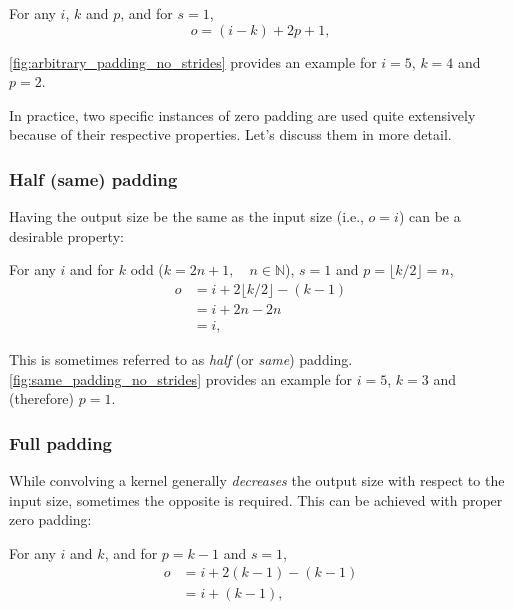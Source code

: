 \begin{relationship}\label{rel:arbitrary_padding_no_strides}
For any $i$, $k$ and $p$, and for $s = 1$,
\begin{equation*}
    o = (i - k) + 2p + 1,
\end{equation*}
\end{relationship}

\noindent \autoref{fig:arbitrary_padding_no_strides} provides an example for $i
= 5$, $k = 4$ and $p = 2$.

In practice, two specific instances of zero padding are used quite extensively
because of their respective properties. Let's discuss them in more detail.

\subsubsection{Half (same) padding}

Having the output size be the same as the input size (i.e., $o = i$) can be a
desirable property:

\begin{relationship}\label{rel:same_padding_no_strides}
For any $i$ and for $k$ odd ($k = 2n + 1, \quad n \in \mathbb{N}$), $s = 1$ and
$p = \lfloor k / 2 \rfloor = n$,
\begin{equation*}
\begin{split}
    o &= i + 2 \lfloor k / 2 \rfloor - (k - 1) \\
      &= i + 2n - 2n \\
      &= i,
\end{split}
\end{equation*}
\end{relationship}

\noindent This is sometimes referred to as {\em half\/} (or {\em same\/})
padding. \autoref{fig:same_padding_no_strides} provides an example for
$i = 5$, $k = 3$ and (therefore) $p = 1$.

\subsubsection{Full padding}

While convolving a kernel generally {\em decreases\/} the output size with
respect to the input size, sometimes the opposite is required. This can be
achieved with proper zero padding:

\begin{relationship}\label{rel:full_padding_no_strides}
For any $i$ and $k$, and for $p = k - 1$ and $s = 1$,
\begin{equation*}
\begin{split}
    o &= i + 2(k - 1) - (k - 1) \\
      &= i + (k - 1),
\end{split}
\end{equation*}
\end{relationship}

